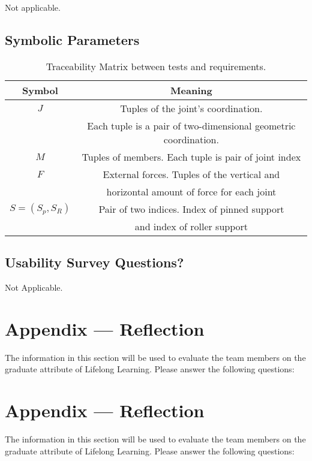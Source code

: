 \documentclass[12pt, titlepage]{article}
\begin{document}
Not applicable.

\subsection{Symbolic Parameters}
\begin{table} [h!]
\centering
\begin{tabular}{|c| c |}
\hline
Symbol & Meaning   \\
 \hline   
 $J$& Tuples of the joint's coordination.\\
 &Each tuple is a pair of two-dimensional geometric coordination.   \\
 \hline
 $M$ & Tuples of members. Each tuple is pair of joint index  \\
 \hline
 $F$ & External forces. Tuples of the vertical and\\
 & horizontal amount of force for each joint  \\
 \hline
 $S=(S_{p} ,S_R)$ &Pair of two indices. Index of pinned support\\
 & and index of roller support \\
 \hline

 
\end{tabular}
\caption{\label{tbl_tr_TC}Traceability Matrix between tests and requirements.}
\end{table}

\subsection{Usability Survey Questions?}

Not Applicable.

\newpage{}
\section*{Appendix --- Reflection}

The information in this section will be used to evaluate the team members on the
graduate attribute of Lifelong Learning.  Please answer the following questions:

\newpage{}
\section*{Appendix --- Reflection}

The information in this section will be used to evaluate the team members on the
graduate attribute of Lifelong Learning.  Please answer the following questions:
\end{document}
